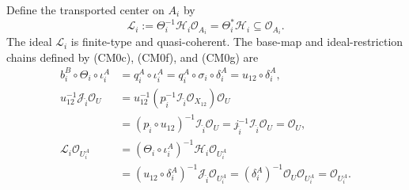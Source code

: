 \begin{definition}
\begin{enumerate}
      Define the transported center on \(A_i\) by
      \[
        \mathcal L_i:=
          \Theta_i^{-1}\mathcal H_i\mathcal O_{A_i}
          =\Theta_i^*\mathcal H_i
          \subseteq\mathcal O_{A_i}.                              \tag{CM0h}
      \]
      The ideal \(\mathcal L_i\) is finite-type and quasi-coherent.  The
      base-map and ideal-restriction chains defined by
      (CM0c), (CM0f), and (CM0g) are
      \[
      \begin{aligned}
        b_i^B\circ\Theta_i\circ\iota_i^A
          &=q_i^A\circ\iota_i^A
           =q_i^A\circ\sigma_i\circ\delta_i^A
           =u_{12}\circ\delta_i^A,\\
        u_{12}^{-1}\mathcal J_{\widehat i}\mathcal O_U
          &=u_{12}^{-1}
              (p_{\widehat i}^{-1}\mathcal I_{\widehat i}
                \mathcal O_{X_{12}})\mathcal O_U\\
          &=(p_{\widehat i}\circ u_{12})^{-1}
              \mathcal I_{\widehat i}\mathcal O_U
           =j_{\widehat i}^{-1}\mathcal I_{\widehat i}\mathcal O_U
           =\mathcal O_U,\\
        \mathcal L_i\mathcal O_{U_i^A}
          &=(\Theta_i\circ\iota_i^A)^{-1}
              \mathcal H_i\mathcal O_{U_i^A}\\
          &=(u_{12}\circ\delta_i^A)^{-1}
              \mathcal J_{\widehat i}\mathcal O_{U_i^A}
           =(\delta_i^A)^{-1}\mathcal O_U\mathcal O_{U_i^A}
           =\mathcal O_{U_i^A}.
      \end{aligned}                                                \tag{CM0i}
      \]


\end{enumerate}
\end{definition}
